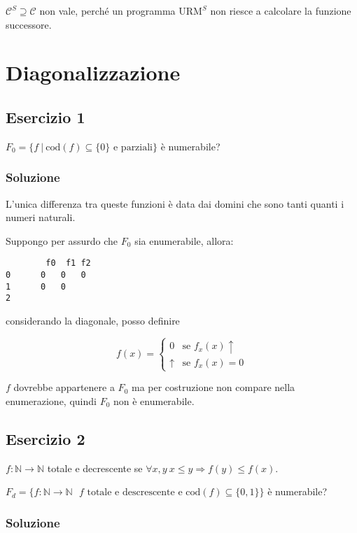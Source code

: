 $\mathcal{C}^S \supseteq \mathcal{C}$ non vale, perché un programma $ \text{URM}^S$ non riesce a calcolare la funzione successore.


\section{Diagonalizzazione}

\subsection{Esercizio 1}

$ F_0 = \{f \: | \: \text{cod}(f) \subseteq \{0\} \text{ e parziali}\}$ è numerabile?

\subsubsection{Soluzione}

L'unica differenza tra queste funzioni è data dai domini che sono tanti quanti i numeri naturali.

Suppongo per assurdo che $ F_0 $ sia enumerabile, allora:

\begin{verbatim}
		f0	f1 f2
0      0   0   0
1      0   0
2
\end{verbatim}

considerando la diagonale, posso definire

$$
f(x) = \begin{cases}
0 &\text{se } f_x(x)\uparrow \\
\uparrow &\text{se } f_x(x)=0
\end{cases}
$$

$ f $ dovrebbe appartenere a $ F_0 $ ma per costruzione non compare nella enumerazione, quindi $ F_0 $ non è enumerabile.

\subsection{Esercizio 2}

$ f : \mathbb{N} \rightarrow \mathbb{N} $ totale e decrescente se $ \forall x,y \: x \leq y \Rightarrow f(y) \leq f(x) $.

$ F_d = \{ f : \mathbb{N} \rightarrow \mathbb{N} \: \ \: f \text{ totale e descrescente e } \text{cod}(f) \subseteq \{0,1\} \} $ è numerabile?

\subsubsection{Soluzione}

